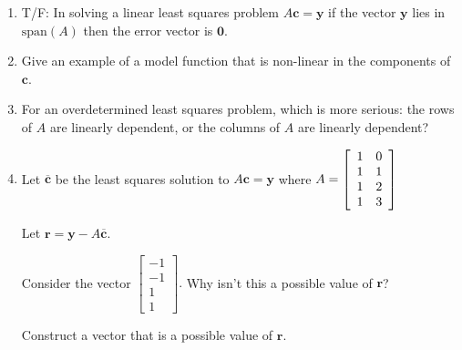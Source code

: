 \documentclass[12pt,letterpaper,noanswers]{exam}
\begin{document}
\begin{enumerate}[resume]
\itemsep50pt
\item T/F: In solving a linear least squares problem $A\mathbf{c} = \mathbf{y}$ if the vector $\mathbf{y}$ lies in $\text{span}(A)$ then the error vector is $\mathbf{0}$.
\item Give an example of a model function that is non-linear in the components of $\mathbf{c}$.
\item For an overdetermined least squares problem, which is more serious: the rows of $A$ are linearly dependent, or the columns of $A$ are linearly dependent?
\item Let $\overline{\mathbf{c}}$ be the least squares  solution to $A\mathbf{c} = \mathbf{y}$ where $A = \left[\begin{array}{c c} 1 & 0 \\
1 & 1 \\
1 & 2 \\
 1 & 3\end{array}\right]$

Let $\mathbf{r} = \mathbf{y} - A\overline{\mathbf{c}}$.

Consider the vector $\left[\begin{array}{r}-1 \\ -1 \\ 1 \\ 1\end{array}\right].$  Why isn't this a possible value of $\mathbf{r}$?

Construct a vector that is a possible value of $\mathbf{r}$.
 
\end{enumerate}
\end{document}
